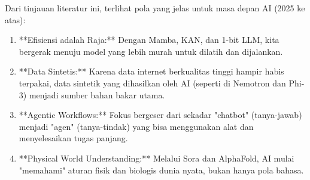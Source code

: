 Dari tinjauan literatur ini, terlihat pola yang jelas untuk masa depan AI (2025 ke atas):

\begin{enumerate}
    \item **Efisiensi adalah Raja:** Dengan Mamba, KAN, dan 1-bit LLM, kita bergerak menuju model yang lebih murah untuk dilatih dan dijalankan.
    \item **Data Sintetis:** Karena data internet berkualitas tinggi hampir habis terpakai, data sintetik yang dihasilkan oleh AI (seperti di Nemotron dan Phi-3) menjadi sumber bahan bakar utama.
    \item **Agentic Workflows:** Fokus bergeser dari sekadar "chatbot" (tanya-jawab) menjadi "agen" (tanya-tindak) yang bisa menggunakan alat dan menyelesaikan tugas panjang.
    \item **Physical World Understanding:** Melalui Sora dan AlphaFold, AI mulai "memahami" aturan fisik dan biologis dunia nyata, bukan hanya pola bahasa.
\end{enumerate}
